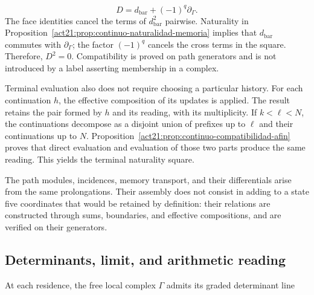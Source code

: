 \[
D=d_{\mathrm{bar}}+(-1)^q\partial_\Gamma.
\]
The face identities cancel the terms of \(d_{\mathrm{bar}}^2\) pairwise. Naturality in Proposition~\ref{act21:prop:continuo-naturalidad-memoria} implies that \(d_{\mathrm{bar}}\) commutes with \(\partial_\Gamma\); the factor \((-1)^q\) cancels the cross terms in the square. Therefore, \(D^2=0\). Compatibility is proved on path generators and is not introduced by a label asserting membership in a complex.

Terminal evaluation also does not require choosing a particular history. For each continuation \(h\), the effective composition of its updates is applied. The result retains the pair formed by \(h\) and its reading, with its multiplicity. If \(k<\ell<N\), the continuations decompose as a disjoint union of prefixes up to \(\ell\) and their continuations up to \(N\). Proposition~\ref{act21:prop:continuo-compatibilidad-afin} proves that direct evaluation and evaluation of those two parts produce the same reading. This yields the terminal naturality square.

The path modules, incidences, memory transport, and their differentials arise from the same prolongations. Their assembly does not consist in adding to a state five coordinates that would be retained by definition: their relations are constructed through sums, boundaries, and effective compositions, and are verified on their generators.

\subsection{Determinants, limit, and arithmetic reading}
At each residence, the free local complex \(\Gamma\) admits its graded determinant line

